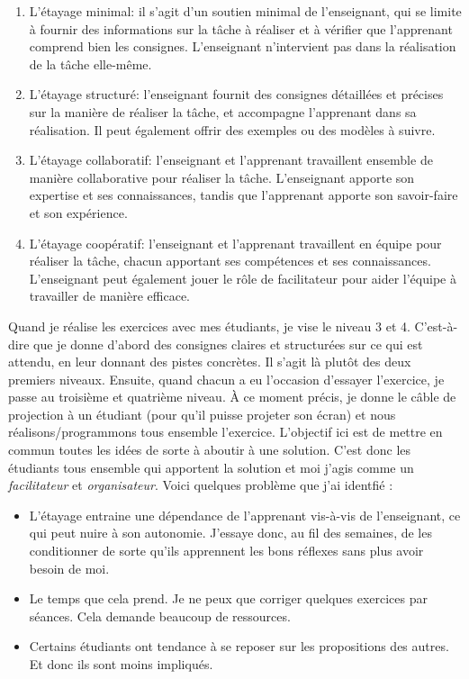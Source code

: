 \begin{enumerate}
    \item L'étayage minimal: il s'agit d'un soutien minimal de l'enseignant, qui se limite à fournir des informations sur la tâche à réaliser et à vérifier que l'apprenant comprend bien les consignes. L'enseignant n'intervient pas dans la réalisation de la tâche elle-même.
    \item L'étayage structuré: l'enseignant fournit des consignes détaillées et précises sur la manière de réaliser la tâche, et accompagne l'apprenant dans sa réalisation. Il peut également offrir des exemples ou des modèles à suivre.
    \item L'étayage collaboratif: l'enseignant et l'apprenant travaillent ensemble de manière collaborative pour réaliser la tâche. L'enseignant apporte son expertise et ses connaissances, tandis que l'apprenant apporte son savoir-faire et son expérience.
    \item L'étayage coopératif: l'enseignant et l'apprenant travaillent en équipe pour réaliser la tâche, chacun apportant ses compétences et ses connaissances. L'enseignant peut également jouer le rôle de facilitateur pour aider l'équipe à travailler de manière efficace.
\end{enumerate}

Quand je réalise les exercices avec mes étudiants, je vise le niveau 3 et 4. C'est-à-dire que je donne d'abord des consignes claires et structurées sur ce qui est attendu, en leur donnant des pistes concrètes. Il s'agit là plutôt des deux premiers niveaux. Ensuite, quand chacun a eu l'occasion d'essayer l'exercice, je passe au troisième et quatrième niveau. À ce moment précis, je donne le câble de projection à un étudiant (pour qu’il puisse projeter son écran) et nous réalisons/programmons tous ensemble l'exercice. L'objectif ici est de mettre en commun toutes les idées de sorte à aboutir à une solution. C'est donc les étudiants tous ensemble qui apportent la solution et moi j'agis comme un \emph{facilitateur} et \emph{organisateur}. Voici quelques problème que j'ai identfié :
\begin{itemize}
    \item L'étayage entraine une dépendance de l'apprenant vis-à-vis de l’enseignant, ce qui peut nuire à son autonomie. J'essaye donc, au fil des semaines, de les conditionner de sorte qu'ils apprennent les bons réflexes sans plus avoir besoin de moi.
    \item Le temps que cela prend. Je ne peux que corriger quelques exercices par séances. Cela demande beaucoup de ressources.
    \item Certains étudiants ont tendance à se reposer sur les propositions des autres. Et donc ils sont moins impliqués.
\end{itemize}

